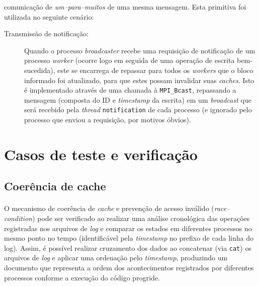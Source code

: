 \documentclass[12pt]{article}
\begin{document}
\begin{description}
    comunicação de \textit{um--para--muitos} de uma mesma mensagem. Esta primitiva foi utilizada no seguinte cenário:
    \begin{description}
      \item[Transmissão de notificação:] Quando o processo \textit{broadcaster} recebe uma requisição de notificação de
        um processo \textit{worker} (ocorre logo em seguida de uma operação de escrita bem-sucedida), este se encarrega
        de repassar para todos os \textit{workers} que o bloco informado foi atualizado, para que estes possam invalidar
        suas \textit{caches}. Isto é implementado através de uma chamada à \texttt{MPI\_Bcast}, repassando a mensagem
        (composta do ID e \textit{timestamp} da escrita) em um \textit{broadcast} que será recebido pela \textit{thread}
        \texttt{notification} de cada processo (e ignorado pelo processo que enviou a requisição, por motivos óbvios).
    \end{description}
\end{description}

\section{Casos de teste e verificação}
\subsection{Coerência de cache}
\paragraph{}
O mecanismo de coerência de \textit{cache} e prevenção de acesso inválido (\textit{race--condition}) pode ser verificado
ao realizar uma análise cronológica das operações registradas nos arquivos de \textit{log} e comparar os estados em
diferentes processos no mesmo ponto no tempo (identificável pela \textit{timestamp} no prefixo de cada linha do log).
Assim, é possível realizar cruzamento dos dados ao concatenar (via \texttt{cat}) os arquivos de \textit{log} e aplicar
uma ordenação pelo \textit{timestamp}, produzindo um documento que representa a ordem dos acontecimentos registrados por
diferentes processos conforme a execução do código progride.
\end{document}
